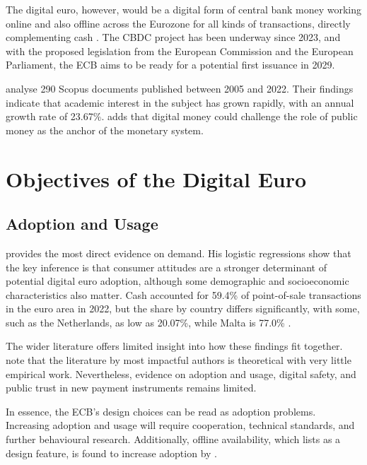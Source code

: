 \documentclass[10pt,a4paper,twocolumn]{article}
\begin{document}
The digital euro, however, would be a digital form of central bank money working online and also offline across the Eurozone for all kinds of transactions, directly complementing cash \parencite{Cipollone2026a}. The CBDC project has been underway since 2023, and with the proposed legislation from the European Commission and the European Parliament, the ECB aims to be ready for a potential first issuance in 2029.

\textcite{Cotugno2024} analyse 290 Scopus documents published between 2005 and 2022. Their findings indicate that academic interest in the subject has grown rapidly, with an annual growth rate of 23.67\%. \textcite{Seiler2026} adds that digital money could challenge the role of public money as the anchor of the monetary system.

\section{Objectives of the Digital Euro}

\subsection{Adoption and Usage}

\textcite{Seiler2026} provides the most direct evidence on demand. His logistic regressions show that the key inference is that consumer attitudes are a stronger determinant of potential digital euro adoption, although some demographic and socioeconomic characteristics also matter. Cash accounted for 59.4\% of point-of-sale transactions in the euro area in 2022, but the share by country differs significantly, with some, such as the Netherlands, as low as 20.07\%, while Malta is 77.0\% \parencite[Table~3]{Seiler2026}.

The wider literature offers limited insight into how these findings fit together. \textcite{Cotugno2024} note that the literature by most impactful authors is theoretical with very little empirical work. Nevertheless, evidence on adoption and usage, digital safety, and public trust in new payment instruments remains limited.

In essence, the ECB's design choices can be read as adoption problems. Increasing adoption and usage will require cooperation, technical standards, and further behavioural research. Additionally, offline availability, which \textcite{Cipollone2026a} lists as a design feature, is found to increase adoption by \textcite{Seiler2026}.
\end{document}

